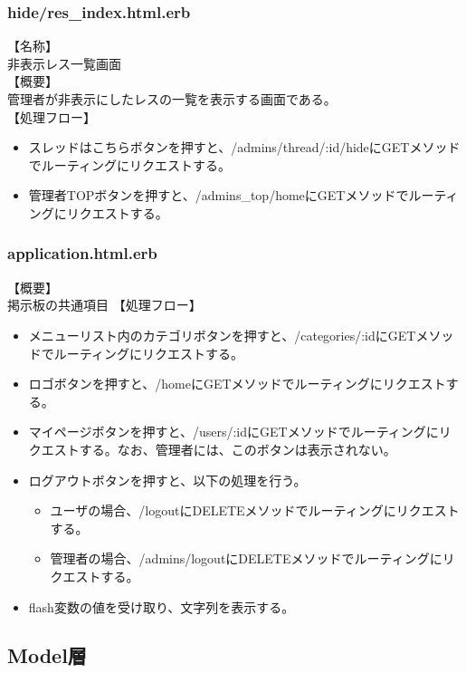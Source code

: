\documentclass[a4j]{jarticle}
\begin{document}
\subsubsection{hide/res\_index.html.erb}
\noindent
【名称】\\
非表示レス一覧画面\\
【概要】\\
管理者が非表示にしたレスの一覧を表示する画面である。\\
【処理フロー】
\begin{itemize}
  \item スレッドはこちらボタンを押すと、/admins/thread/:id/hideにGETメソッドでルーティングにリクエストする。
  \item 管理者TOPボタンを押すと、/admins\_top/homeにGETメソッドでルーティングにリクエストする。
\end{itemize}

\subsubsection{application.html.erb}
\noindent

【概要】\\
掲示板の共通項目
【処理フロー】
\begin{itemize}
 \item メニューリスト内のカテゴリボタンを押すと、/categories/:idにGETメソッドでルーティングにリクエストする。
 \item ロゴボタンを押すと、/homeにGETメソッドでルーティングにリクエストする。
 \item マイページボタンを押すと、/users/:idにGETメソッドでルーティングにリクエストする。なお、管理者には、このボタンは表示されない。
 \item ログアウトボタンを押すと、以下の処理を行う。
 \begin{itemize}
   \item ユーザの場合、/logoutにDELETEメソッドでルーティングにリクエストする。
   \item 管理者の場合、/admins/logoutにDELETEメソッドでルーティングにリクエストする。
 \end{itemize}
 \item flash変数の値を受け取り、文字列を表示する。
\end{itemize}

\subsection{Model層}
\end{document}

